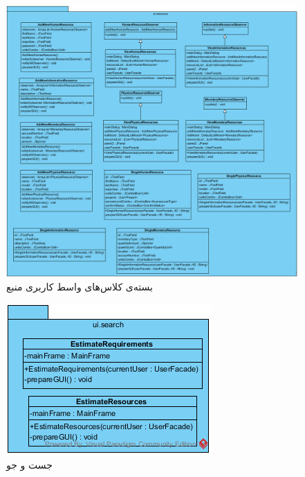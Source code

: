 \begin{figure}[H]
	\centering
	\includegraphics[width=\textwidth]{img/class-design/ui/UIResource}
	
	\caption{بسته‌ی کلاس‌های واسط کاربری منبع}
\end{figure}

\begin{figure}[H]
	\centering
	\includegraphics[width=\textwidth]{img/class-design/ui/UISearch}
	
	\caption{جست و جو}
\end{figure}

